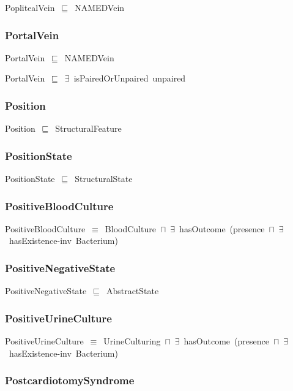 \documentclass{article}
\begin{document}
PoplitealVein~\ensuremath{\sqsubseteq}~NAMEDVein~

\subsubsection*{PortalVein}

PortalVein~\ensuremath{\sqsubseteq}~NAMEDVein~

PortalVein~\ensuremath{\sqsubseteq}~\ensuremath{\exists}~isPairedOrUnpaired~unpaired~

\subsubsection*{Position}

Position~\ensuremath{\sqsubseteq}~StructuralFeature~

\subsubsection*{PositionState}

PositionState~\ensuremath{\sqsubseteq}~StructuralState~

\subsubsection*{PositiveBloodCulture}

PositiveBloodCulture~\ensuremath{\equiv}~BloodCulture~\ensuremath{\sqcap}~\ensuremath{\exists}~hasOutcome~(presence~\ensuremath{\sqcap}~\ensuremath{\exists}~hasExistence-inv~Bacterium)

\subsubsection*{PositiveNegativeState}

PositiveNegativeState~\ensuremath{\sqsubseteq}~AbstractState~

\subsubsection*{PositiveUrineCulture}

PositiveUrineCulture~\ensuremath{\equiv}~UrineCulturing~\ensuremath{\sqcap}~\ensuremath{\exists}~hasOutcome~(presence~\ensuremath{\sqcap}~\ensuremath{\exists}~hasExistence-inv~Bacterium)

\subsubsection*{PostcardiotomySyndrome}
\end{document}
